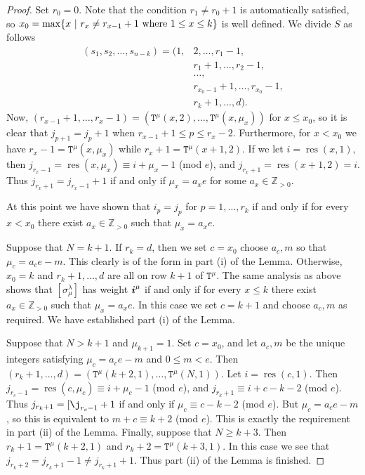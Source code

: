 \documentclass[twoside,11pt,reqno,letter]{amsart}
\numberwithin{equation}{section}
\theoremstyle{definition}  %
\def\bi{\text{\boldmath$i$}}
\newcommand{\res}{\operatorname{res}}
\newcommand{\Z}{\mathbb{Z}}
\newcommand{\0}{{\bar 0}}
\newcommand{\1}{{\bar 1}}
\newcommand{\la}{\lambda}
\newcommand{\si}{\sigma}
\def\T{{\mathtt T}}
\begin{document}
{\begin{proof}
  Set $r_0 = 0$. Note that the condition $r_1 \neq r_0 + 1$ is automatically satisfied, so $x_0 = \max \{x\ |\ r_x \neq r_{x-1} + 1 \textup{ where } 1 \leq x \leq k\}$ is well defined. We divide $S$ as follows
\begin{align*}
  (s_1, s_2, \dots, s_{n-k}) = (1, & 2, \dots, r_1-1, \\
                                   & r_1+1, \dots, r_2-1, \\
                                   & \dots, \\
                                   & r_{x_0-1}+1, \dots, r_{x_0}-1, \\
                             & r_k+1, \dots, d).
\end{align*}
Now, $(r_{x-1}+1, \dots, r_x-1) = (\T^\mu(x, 2), \dots, \T^\mu(x, \mu_x))$ for $x \leq x_0$, so it is clear that $j_{p+1} = j_p + 1$ when $r_{x-1}+1 \leq p \leq r_x-2$. Furthermore, for $x < x_0$ we have $r_x - 1 = \T^\mu(x, \mu_x)$ while $r_x + 1 = \T^\mu(x+1,2)$. If we let $i = \res(x,1)$, then $j_{r_x-1} = \res(x, \mu_x) \equiv i + \mu_x - 1$ (mod $e$), and $j_{r_x+1} = \res(x+1,2) = i$. Thus $j_{r_x+1} = j_{r_x-1} + 1$ if and only if $\mu_x = a_x e$ for some $a_x \in \Z_{>0}$.

  At this point we have shown that $i_p = j_p$ for $p = 1, \dots, r_k$ if and only if for every $x < x_0$ there exist $a_x \in \Z_{>0}$ such that $\mu_x = a_x e$.

  Suppose that $N = k+1$. If $r_k = d$, then we set $c = x_0$ choose $a_c, m$ so that $\mu_c = a_c e - m$. This clearly is of the form in part (i) of the Lemma. Otherwise, $x_0 = k$ and $r_k + 1, \dots, d$ are all on row $k+1$ of $\T^\mu$. The same analysis as above shows that $[\si^\la_\mu]$ has weight $\bi^\mu$ if and only if for every $x \leq k$ there exist $a_x \in \Z_{>0}$ such that $\mu_x = a_x e$. In this case we set $c = k+1$ and choose $a_c, m$ as required. We have established part (i) of the Lemma.

  Suppose that $N > k+1$ and $\mu_{k+1} = 1$. Set $c = x_0$, and let $a_c, m$ be the unique integers satisfying $\mu_c = a_c e - m$ and $0 \leq m < e$. Then $(r_k+1, \dots, d) = (\T^\mu(k+2,1), \dots, \T^\mu(N,1))$. Let $i = \res(c,1)$. Then $j_{r_c-1} = \res(c, \mu_c) \equiv i + \mu_c - 1$ (mod $e$), and $j_{r_k+1} \equiv i + c - k - 2$ (mod $e$). Thus $j_{r_k+1} = [\j_{r_c-1} + 1$ if and only if $\mu_c \equiv c - k - 2$ (mod $e$). But $\mu_c = a_c e - m$, so this is equivalent to $m+c \equiv k+2$ (mod $e$). This is exactly the requirement in part (ii) of the Lemma. Finally, suppose that $N \geq k+3$. Then $r_k+1 = \T^\mu(k+2,1)$ and $r_k+2 = \T^\mu(k+3,1)$. In this case we see that $j_{r_k + 2} = j_{r_k + 1} - 1 \neq j_{r_k + 1} + 1$. Thus part (ii) of the Lemma is finished.


\end{proof}}
\end{document}
